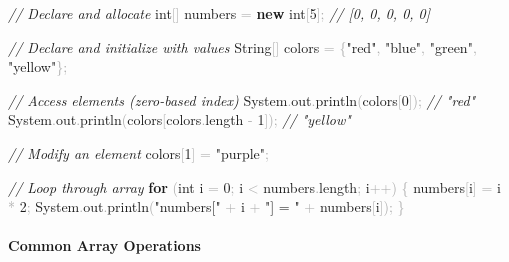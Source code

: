 \documentclass[
  justified,
  openright,
]{tufte-book}
\let\subsection\paragraph
\let\paragraph\paragraph
\newcommand{\KeywordTok}[1]{\textcolor{CodeKeyword}{\textbf{#1}}}  %
\newcommand{\StringTok}[1]{\textcolor{CodeString}{#1}}              %
\newcommand{\CommentTok}[1]{\textcolor{CodeComment}{\textit{#1}}}  %
\newcommand{\CodeNumTok}[1]{\textcolor{CodeNumber}{#1}}             %
\newcommand{\CodeFuncTok}[1]{\textcolor{CodeKeyword}{#1}}           %
\newcommand{\CodeTypeTok}[1]{\textcolor{CodeType}{#1}}              %
\newcommand{\OperatorTok}[1]{\textcolor{DarkGray}{#1}}              %
\newenvironment{Shaded}{%
  \begin{mdframed}[style=TufteCode]%
}{%
  \end{mdframed}%
}
\let\subsection\paragraph
\let\paragraph\paragraph
\begin{document}
\begin{Shaded}
\begin{Highlighting}[]
\CommentTok{// Declare and allocate}
\CodeTypeTok{int}\OperatorTok{[]} numbers \OperatorTok{=} \KeywordTok{new} \CodeTypeTok{int}\OperatorTok{[}\CodeNumTok{5}\OperatorTok{];}            \CommentTok{// [0, 0, 0, 0, 0]}
 
\CommentTok{// Declare and initialize with values}
String\OperatorTok{[]} colors \OperatorTok{=} \OperatorTok{\{}\StringTok{"red"}\OperatorTok{,} \StringTok{"blue"}\OperatorTok{,} \StringTok{"green"}\OperatorTok{,} \StringTok{"yellow"}\OperatorTok{\};}
 
\CommentTok{// Access elements (zero{-}based index)}
System\OperatorTok{.}\CodeFuncTok{out}\OperatorTok{.}\CodeFuncTok{println}\OperatorTok{(}colors\OperatorTok{[}\CodeNumTok{0}\OperatorTok{]);}         \CommentTok{// "red"}
System\OperatorTok{.}\CodeFuncTok{out}\OperatorTok{.}\CodeFuncTok{println}\OperatorTok{(}colors\OperatorTok{[}colors\OperatorTok{.}\CodeFuncTok{length} \OperatorTok{{-}} \CodeNumTok{1}\OperatorTok{]);}  \CommentTok{// "yellow"}
 
\CommentTok{// Modify an element}
colors\OperatorTok{[}\CodeNumTok{1}\OperatorTok{]} \OperatorTok{=} \StringTok{"purple"}\OperatorTok{;}
 
\CommentTok{// Loop through array}
\KeywordTok{for} \OperatorTok{(}\CodeTypeTok{int} i \OperatorTok{=} \CodeNumTok{0}\OperatorTok{;} i \OperatorTok{\textless{}} numbers\OperatorTok{.}\CodeFuncTok{length}\OperatorTok{;} i\OperatorTok{++)} \OperatorTok{\{}
    numbers\OperatorTok{[}i\OperatorTok{]} \OperatorTok{=} i \OperatorTok{*} \CodeNumTok{2}\OperatorTok{;}
    System\OperatorTok{.}\CodeFuncTok{out}\OperatorTok{.}\CodeFuncTok{println}\OperatorTok{(}\StringTok{"numbers["} \OperatorTok{+} i \OperatorTok{+} \StringTok{"] = "} \OperatorTok{+} numbers\OperatorTok{[}i\OperatorTok{]);}
\OperatorTok{\}}
\end{Highlighting}
\end{Shaded}

\subsection{Common Array Operations}\label{common-array-operations}
\end{document}
